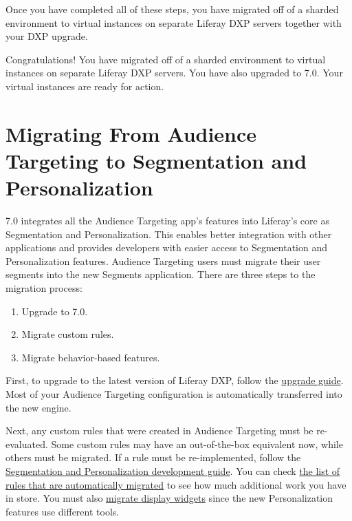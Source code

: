 Once you have completed all of these steps, you have migrated off of a
sharded environment to virtual instances on separate Liferay DXP servers
together with your DXP upgrade.

Congratulations! You have migrated off of a sharded environment to
virtual instances on separate Liferay DXP servers. You have also
upgraded to 7.0. Your virtual instances are ready for action.

\chapter{Migrating From Audience Targeting to Segmentation and
Personalization}\label{migrating-from-audience-targeting-to-segmentation-and-personalization}

7.0 integrates all the Audience Targeting app's features into Liferay's
core as Segmentation and Personalization. This enables better
integration with other applications and provides developers with easier
access to Segmentation and Personalization features. Audience Targeting
users must migrate their user segments into the new Segments
application. There are three steps to the migration process:

\begin{enumerate}
\def\labelenumi{\arabic{enumi}.}
\item
  Upgrade to 7.0.
\item
  Migrate custom rules.
\item
  Migrate behavior-based features.
\end{enumerate}

First, to upgrade to the latest version of Liferay DXP, follow the
\href{/docs/7-2/tutorials/-/knowledge_base/t/upgrading-code-to-product-ver}{upgrade
guide}. Most of your Audience Targeting configuration is automatically
transferred into the new engine.

Next, any custom rules that were created in Audience Targeting must be
re-evaluated. Some custom rules may have an out-of-the-box equivalent
now, while others must be migrated. If a rule must be re-implemented,
follow the
\href{/docs/7-2/frameworks/-/knowledge_base/f/segmentation-personalization}{Segmentation
and Personalization development guide}. You can check
\href{/docs/7-2/deploy/-/knowledge_base/d/migrating-user-segments}{the
list of rules that are automatically migrated} to see how much
additional work you have in store. You must also
\href{/docs/7-2/deploy/-/knowledge_base/d/manually-migrating-from-audience-targeting}{migrate
display widgets} since the new Personalization features use different
tools.

